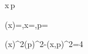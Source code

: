 \Delta x\,\Delta p\ge\frac{}

\psi(x)=,\quad \Delta x=\sigma,\quad \Delta p=\frac{\hbar}{2\sigma}

(\Delta x)^2(\Delta p)^2-(x,p)^2=4
